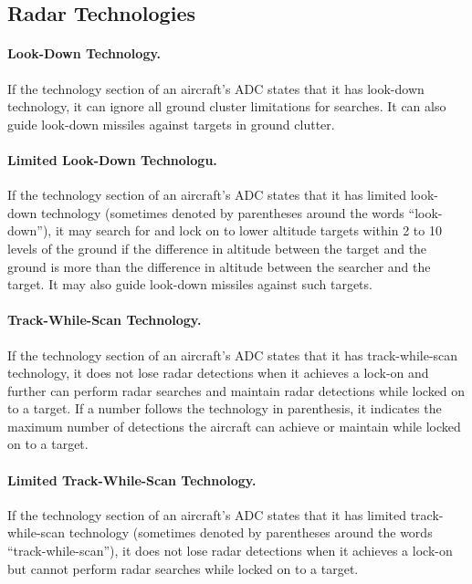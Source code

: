 \begin{advancedrules}
{\section{Radar Technologies}

\paragraph{Look-Down Technology.} \label{rule:look-down-missiles}
If the technology section of an aircraft’s ADC states that it has look-down technology, it can ignore all ground cluster limitations for searches. It can also guide look-down missiles against targets in ground clutter.

\paragraph{Limited Look-Down Technologu.} If the technology section of an aircraft’s ADC states that it has limited look-down technology (sometimes denoted by parentheses around the words “look-down”), it may search for and lock on to lower altitude targets within 2 to 10 levels of the ground if the difference in altitude between the target and the ground is more than the difference in altitude between the searcher and the target. It may also guide look-down missiles against such targets.


\paragraph{Track-While-Scan Technology.} If the technology section of an aircraft’s ADC states that it has track-while-scan technology, it does not lose radar detections when it achieves a lock-on and further can perform radar searches and maintain radar detections while locked on to a target.
If a number follows the technology in parenthesis, it indicates the maximum number of detections the aircraft can achieve or maintain while locked on to a target.


\paragraph{Limited Track-While-Scan Technology.} If the technology section of an aircraft’s ADC states that it has limited track-while-scan technology (sometimes denoted by parentheses around the words “track-while-scan”), it does not lose radar detections when it achieves a lock-on but cannot perform radar searches while locked on to a target.

}
\end{advancedrules}
